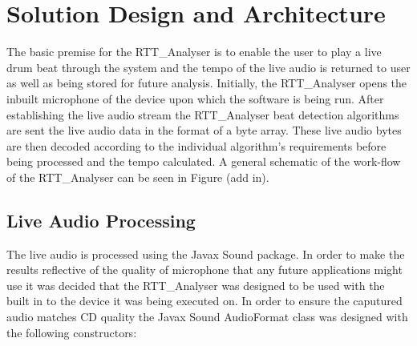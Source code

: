 \documentclass[a4paper, 11pt]{article}
\begin{document}
\maketitle{} \section{Solution Design and Architecture}
The basic premise for the RTT\_Analyser is to enable the user to play a live drum beat through the system and the tempo of the live audio is returned to user as well as being stored for future analysis. Initially, the RTT\_Analyser opens the inbuilt microphone of the device upon which the software is being run. After establishing the live audio stream the RTT\_Analyser beat detection algorithms are sent the live audio data in the format of a byte array. These live audio bytes are then decoded according to the individual algorithm's requirements before being processed and the tempo calculated. A general schematic of the work-flow of the RTT\_Analyser can be seen in Figure (add in).

\subsection{Live Audio Processing}
The live audio is processed using the Javax Sound package. In order to make the results reflective of the quality of microphone that any future applications might use it was decided that the RTT\_Analyser was designed to be used with the built in to the device it was being executed on. In order to ensure the caputured audio matches CD quality the Javax Sound AudioFormat class was designed with the following constructors: 
\end{document}
